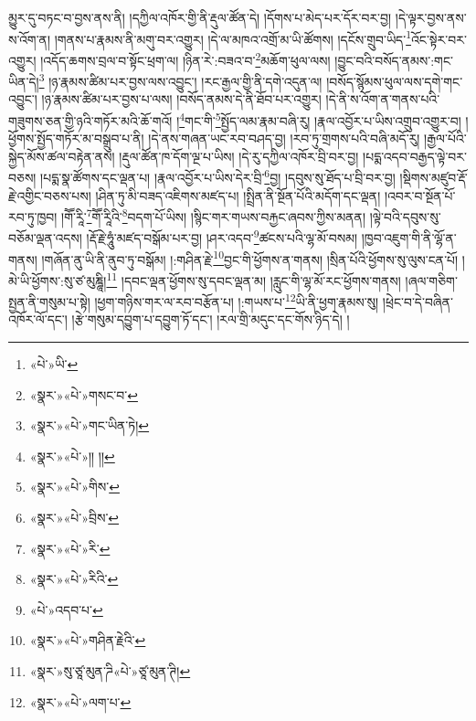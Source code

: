 མྱུར་དུ་བཏང་བ་བྱས་ནས་ནི། །དཀྱིལ་འཁོར་གྱི་ནི་རྡུལ་ཚོན་དེ། །དོགས་པ་མེད་པར་དོར་བར་བྱ། །དེ་ལྟར་བྱས་ནས་ས་འོག་ན། །གནས་པ་རྣམས་ནི་མགུ་བར་འགྱུར། །དེ་ལ་མཁའ་འགྲོ་མ་ཡི་ཚོགས། །དངོས་གྲུབ་ཡིད་\footnote{«པེ་»ཡི་}འོང་སྟེར་བར་འགྱུར། །འདོད་ཆགས་བྲལ་བ་སྟོང་ཕྲག་ལ། །ཉིན་རེ་:བཟའ་བ་\footnote{«སྣར་»«པེ་»གསང་བ་}མཆོག་ཕུལ་ལས། །བྱུང་བའི་བསོད་ནམས་:གང་ཡིན་དེ།\footnote{«སྣར་»«པེ་»གང་ཡིན་ཏེ།} །ཉ་རྣམས་ཚིམ་པར་བྱས་ལས་འབྱུང་། །རང་རྒྱལ་གྱི་ནི་དགེ་འདུན་ལ། །བསོད་སྙོམས་ཕུལ་ལས་དགེ་གང་འབྱུང་། །ཉ་རྣམས་ཚིམ་པར་བྱས་པ་ལས། །བསོད་ནམས་དེ་ནི་ཐོབ་པར་འགྱུར། །དེ་ནི་ས་འོག་ན་གནས་པའི་གཟུགས་ཅན་གྱི་ཉའི་གཏོར་མའི་ཆོ་གའོ། །\footnote{«སྣར་»«པེ་»།། །།}གང་གི་\footnote{«སྣར་»«པེ་»གིས་}སྤྱོད་ལམ་རྣམ་བཞི་རུ། །རྣལ་འབྱོར་པ་ཡིས་འགྲུབ་འགྱུར་བ། །ཕྱོགས་སྤྱོད་གཏོར་མ་བསྒྲུབ་པ་ནི། །དེ་ནས་གཞན་ཡང་རབ་བཤད་བྱ། །རབ་ཏུ་གྲགས་པའི་བཞི་མདོ་རུ། །རྒྱལ་པོའི་སྐྱེད་མོས་ཚལ་བརྟེན་ནས། །རྡུལ་ཚོན་ཁ་དོག་ལྔ་པ་ཡིས། །དེ་རུ་དཀྱིལ་འཁོར་བྲི་བར་བྱ། །པདྨ་འདབ་བརྒྱད་ལྟེ་བར་བཅས། །པདྨ་སྣ་ཚོགས་དང་ལྡན་པ། །རྣལ་འབྱོར་པ་ཡིས་དེར་བྲི་\footnote{«སྣར་»«པེ་»བྲིས་}བྱ། །དབུས་སུ་ཐོད་པ་བྲི་བར་བྱ། །སྡིགས་མཛུབ་རྡོ་རྗེ་འགྱིང་བཅས་པས། །ཤིན་ཏུ་མི་བཟད་འཇིགས་མཛད་པ། །སྤྲིན་ནི་སྔོན་པོའི་མདོག་དང་ལྡན། །འབར་བ་སྔོན་པོ་རབ་ཏུ་ཁྱབ། །གཽ་རཱི་\footnote{«སྣར་»«པེ་»རི་}གཽ་རཱིའི་\footnote{«སྣར་»«པེ་»རིའི་}བདག་པོ་ཡིས། །སྙིང་གར་གཡས་བརྐྱང་ཞབས་ཀྱིས་མནན། །ལྟེ་བའི་དབུས་སུ་བཅོམ་ལྡན་འདས། །རྡོ་རྗེ་ཧཱུཾ་མཛད་བསྒོམ་པར་བྱ། །ཤར་འདབ་\footnote{«པེ་»འདབ་པ་}ཚངས་པའི་ལྷ་མོ་བསམ། །ཁྱབ་འཇུག་གི་ནི་ལྷོ་ན་གནས། །གཞོན་ནུ་ཡི་ནི་ནུབ་ཏུ་བསྒོམ། །:གཤིན་རྗེ་\footnote{«སྣར་»«པེ་»གཤིན་རྗེའི་}བྱང་གི་ཕྱོགས་ན་གནས། །སྲིན་པོའི་ཕྱོགས་སུ་ལུས་ངན་པོ། །མེ་ཡི་ཕྱོགས་:སུ་ཙ་མུཎྜཱི།\footnote{«སྣར་»སུ་ཙཱ་མུན་ཌི«པེ་»ཙཱ་མུན་ཊི།} །དབང་ལྡན་ཕྱོགས་སུ་དབང་ལྡན་མ། །རླུང་གི་ལྷ་མོ་རང་ཕྱོགས་གནས། །ཞལ་གཅིག་སྤྱན་ནི་གསུམ་པ་སྟེ། །ཕྱག་གཉིས་གར་ལ་རབ་བརྩོན་པ། །:གཡས་པ་\footnote{«སྣར་»«པེ་»ལག་པ་}ཡི་ནི་ཕྱག་རྣམས་སུ། །ཕྲེང་བ་དེ་བཞིན་འཁོར་ལོ་དང་། །རྩེ་གསུམ་དབྱུག་པ་དབྱུག་ཏོ་དང་། །རལ་གྲི་མདུང་དང་གོས་ཉིད་དེ། །
